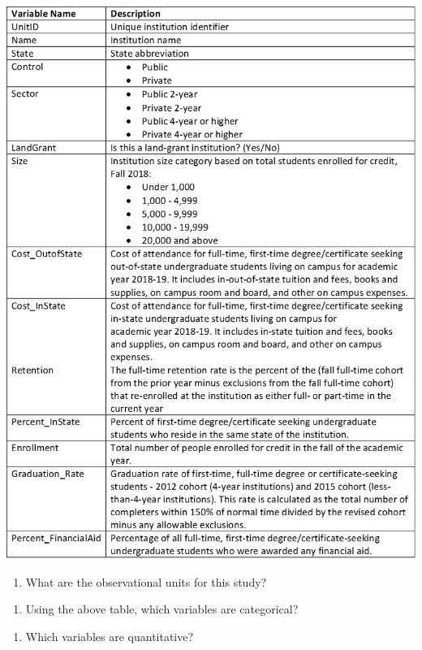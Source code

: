 \documentclass[
]{report}
\providecommand{\tightlist}{%
  \setlength{\itemsep}{0pt}\setlength{\parskip}{0pt}}
\begin{document}
\begin{center}\includegraphics[width=0.75\linewidth]{images/IPEDS_Description} \end{center}

\begin{enumerate}
\def\labelenumi{\arabic{enumi}.}
\tightlist
\item
  What are the observational units for this study?
\end{enumerate}

\vspace{0.3in}

\begin{enumerate}
\def\labelenumi{\arabic{enumi}.}
\setcounter{enumi}{1}
\tightlist
\item
  Using the above table, which variables are categorical?
\end{enumerate}

\vspace{1in}

\begin{enumerate}
\def\labelenumi{\arabic{enumi}.}
\setcounter{enumi}{2}
\tightlist
\item
  Which variables are quantitative?
\end{enumerate}

\vspace{1in}
\end{document}
